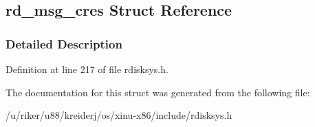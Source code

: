 \hypertarget{structrd__msg__cres}{}\subsection{rd\+\_\+msg\+\_\+cres Struct Reference}
\label{structrd__msg__cres}


\subsubsection{Detailed Description}


Definition at line 217 of file rdisksys.\+h.



The documentation for this struct was generated from the following file\+:\begin{DoxyCompactItemize}
\item 
/u/riker/u88/kreiderj/os/xinu-\/x86/include/rdisksys.\+h\end{DoxyCompactItemize}
